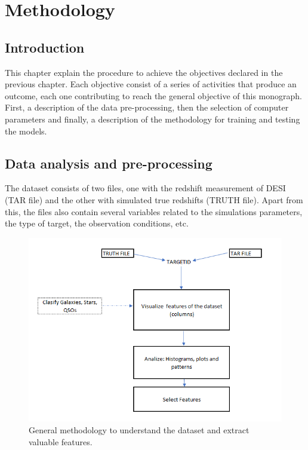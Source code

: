 \chapter{Methodology}
\section{Introduction}
This chapter explain the procedure to achieve the objectives declared in the previous chapter. Each objective consist of a series of activities that produce an outcome, each one contributing to reach the general objective of this monograph. First, a description of the data pre-processing, then the selection of computer parameters and finally, a description of the methodology for training and testing the models. 
\section{Data analysis and pre-processing}
The dataset consists of two files, one with the redshift measurement of DESI (TAR file) and the other with simulated true redshifts (TRUTH file). Apart from this, the files also contain several variables related to the simulations parameters, the type of target, the observation conditions, etc. 
\begin{figure}[h!]
	\centering
	\includegraphics[width=1\linewidth]{TeX_files/Imagenes/metho_1}
	\caption{General methodology to understand the dataset and extract valuable features.}
	\label{fig:metho1}
\end{figure}
